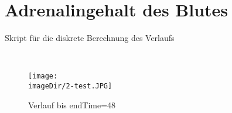 \section{Adrenalingehalt des Blutes}
\begin{code}
	\caption{Skript für die diskrete Berechnung des Verlaufs}
	\label{source:2-script}
\end{code}
\ \newline
 

\newpage

\begin{figure}[h]
\centering
\texttt{[image: \\imageDir/2-test.JPG]}
\caption{Verlauf bis endTime=48}
\label{fig:1-c-modell}
\end{figure}
\ \newpage